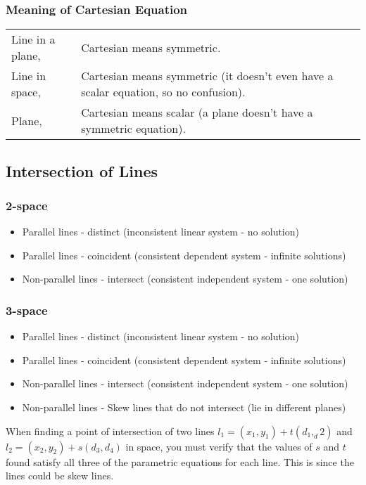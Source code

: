 \documentclass[letterpaper, 12pt]{report}
\theoremstyle{definition}
\numberwithin{equation}{section}
\begin{document}
\subsubsection{Meaning of Cartesian Equation}
\begin{tabularx}{\textwidth}{l X}
Line in a plane, & Cartesian means symmetric. \\
	Line in space, & Cartesian means symmetric (it doesn't even have a scalar equation, so no confusion). \\
	Plane, & Cartesian means scalar (a plane doesn't have a symmetric equation).
\end{tabularx}
	\subsection{Intersection of Lines}
\subsubsection{2-space}
\begin{itemize}
	\item Parallel lines - distinct (inconsistent linear system - no solution)
	\item Parallel lines - coincident (consistent dependent system - infinite solutions)
	\item Non-parallel lines - intersect (consistent independent system - one solution)
\end{itemize}
\subsubsection{3-space}
\begin{itemize}
	\item Parallel lines - distinct (inconsistent linear system - no solution)
	\item Parallel lines - coincident (consistent dependent system - infinite solutions)
	\item Non-parallel lines - intersect (consistent independent system - one solution)
	\item Non-parallel lines - Skew lines that do not intersect (lie in different planes)
\end{itemize}
When finding a point of intersection of two lines $l_1 = (x_1,y_1) + t(d_1,_d2)$ and $l_2 = (x_2,y_2) + s(d_3,d_4)$ in space, you must verify that the values of $s$ and $t$ found satisfy all three of the parametric equations for each line. This is since the lines could be skew lines.
\end{document}

